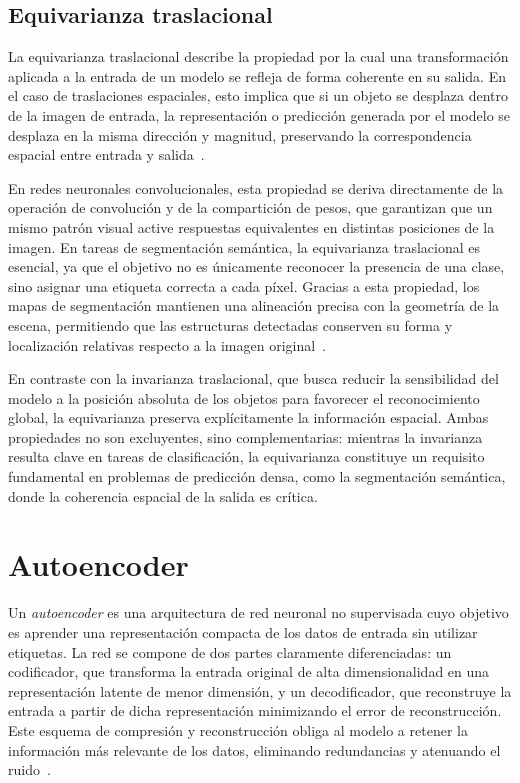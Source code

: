 \subsection{Equivarianza traslacional}
La equivarianza traslacional describe la propiedad por la cual una transformación aplicada a la entrada de un modelo se refleja de forma coherente en su salida. En el caso de traslaciones espaciales, esto implica que si un objeto se desplaza dentro de la imagen de entrada, la representación o predicción generada por el modelo se desplaza en la misma dirección y magnitud, preservando la correspondencia espacial entre entrada y salida~\cite{khan2022transformersvision}.

En redes neuronales convolucionales, esta propiedad se deriva directamente de la operación de convolución y de la compartición de pesos, que garantizan que un mismo patrón visual active respuestas equivalentes en distintas posiciones de la imagen. En tareas de segmentación semántica, la equivarianza traslacional es esencial, ya que el objetivo no es únicamente reconocer la presencia de una clase, sino asignar una etiqueta correcta a cada píxel. Gracias a esta propiedad, los mapas de segmentación mantienen una alineación precisa con la geometría de la escena, permitiendo que las estructuras detectadas conserven su forma y localización relativas respecto a la imagen original~\cite{liu2022convnext}.

En contraste con la invarianza traslacional, que busca reducir la sensibilidad del modelo a la posición absoluta de los objetos para favorecer el reconocimiento global, la equivarianza preserva explícitamente la información espacial. Ambas propiedades no son excluyentes, sino complementarias: mientras la invarianza resulta clave en tareas de clasificación, la equivarianza constituye un requisito fundamental en problemas de predicción densa, como la segmentación semántica, donde la coherencia espacial de la salida es crítica.

\section{Autoencoder}
Un \textit{autoencoder} es una arquitectura de red neuronal no supervisada cuyo objetivo es aprender una representación compacta de los datos de entrada sin utilizar etiquetas. La red se compone de dos partes claramente diferenciadas: un codificador, que transforma la entrada original de alta dimensionalidad en una representación latente de menor dimensión, y un decodificador, que reconstruye la entrada a partir de dicha representación minimizando el error de reconstrucción. Este esquema de compresión y reconstrucción obliga al modelo a retener la información más relevante de los datos, eliminando redundancias y atenuando el ruido~\cite{neloy2024autoencoders}.

